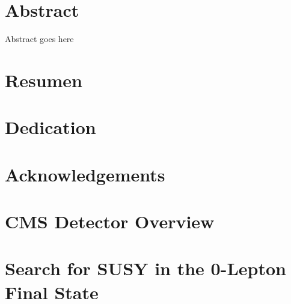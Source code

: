 \documentclass[12pt,twoside,openany]{book}
\begin{document}


\frontmatter
\chapter*{Abstract}
Abstract goes here
\chapter*{Resumen}
\chapter*{Dedication}
\chapter*{Acknowledgements}
\tableofcontents

\mainmatter
%

%

\chapter{CMS Detector Overview}


\chapter{Search for SUSY in the 0-Lepton Final State}


%

%

%

{}

\end{document}
